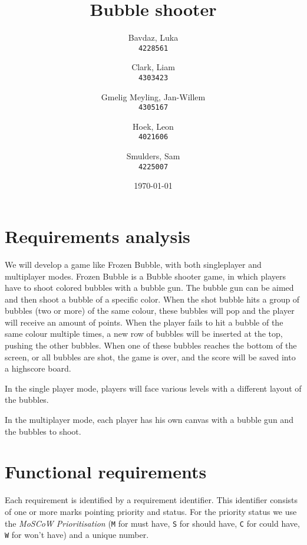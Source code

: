 \documentclass[a4paper]{article}
\title{Bubble shooter}
\author{
    Bavdaz, Luka\\
    \texttt{4228561}
    \and
    Clark, Liam\\
    \texttt{4303423}
    \and
    Gmelig Meyling, Jan-Willem\\
    \texttt{4305167}
    \and
    Hoek, Leon\\
    \texttt{4021606}
    \and
    Smulders, Sam\\
    \texttt{4225007}
}
\date{\today}
\begin{document}
\maketitle


\section{Requirements analysis}
We will develop a game like Frozen Bubble, with both singleplayer and multiplayer modes. Frozen Bubble is a Bubble shooter game, in which players have to shoot colored bubbles with a bubble gun. The bubble gun can be aimed and then shoot a bubble of a specific color. When the shot bubble hits a group of bubbles (two or more) of the same colour, these bubbles will pop and the player will receive an amount of points. When the player fails to hit a bubble of the same colour multiple times, a new row of bubbles will be inserted at the top, pushing the other bubbles. When one of these bubbles reaches the bottom of the screen, or all bubbles are shot, the game is over, and the score will be saved into a highscore board.
\par In the single player mode, players will face various levels with a different layout of the bubbles.
\par In the multiplayer mode, each player has his own canvas with a bubble gun and the bubbles to shoot.



\section{Functional requirements}
Each requirement is identified by a requirement identifier. This identifier consists of one or more marks pointing priority and status. For the priority status we use the \textit{MoSCoW Prioritisation} \citep{moscow} (\texttt{M} for must have, \texttt{S} for should have, \texttt{C} for could have, \texttt{W} for won't have) and a unique number.

%

\end{document}
